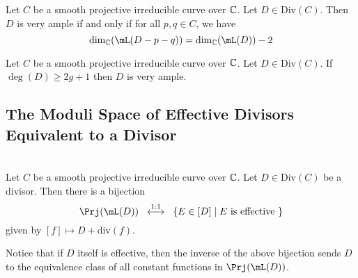 \documentclass[a4paper]{article}
\begin{document}
\begin{prp}{}{} Let $C$ be a smooth projective irreducible curve over $\mathbb{C}$. Let $D\in\text{Div}(C)$. Then $D$ is very ample if and only if for all $p,q\in C$, we have $$\dim_\C(\mL(D-p-q))=\dim_\C(\mL(D))-2$$
\end{prp}

\begin{crl}{}{} Let $C$ be a smooth projective irreducible curve over $\mathbb{C}$. Let $D\in\text{Div}(C)$. If $\deg(D)\geq 2g+1$ then $D$ is very ample. 
\end{crl}

\subsection{The Moduli Space of Effective Divisors Equivalent to a Divisor}
\begin{prp}{}{}\\
Let $C$ be a smooth projective irreducible curve over $\mathbb{C}$. Let $D\in\text{Div}(C)$ be a divisor. Then there is a bijection $$\Prj(\mL(D))\;\;\overset{1:1}{\longleftrightarrow}\;\;\{E\in[D]\;|\;E\text{ is effective }\}$$ given by $[f]\mapsto D+\text{div}(f)$. 
\end{prp}

Notice that if $D$ itself is effective, then the inverse of the above bijection sends $D$ to the equivalence class of all constant functions in $\Prj(\mL(D))$. 
\end{document}
